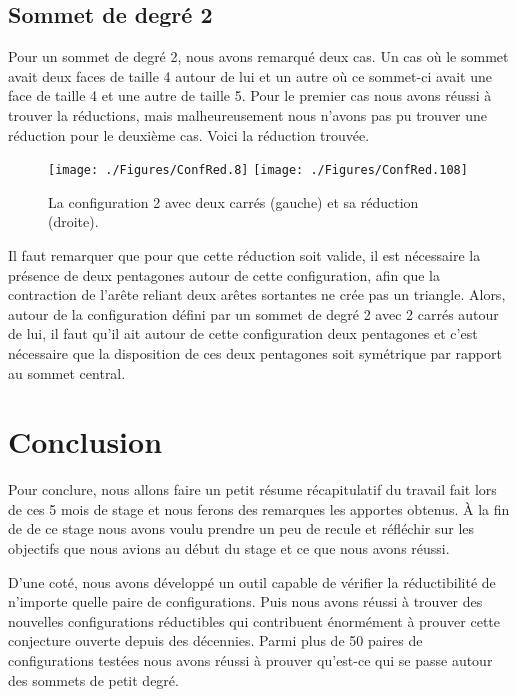 \documentclass[10pt,a4paper]{article}
\begin{document}
\subsection{Sommet de degré 2}
Pour un sommet de degré 2, nous avons remarqué deux cas. Un cas où le sommet avait deux faces de taille 4 autour de lui et un autre où ce sommet-ci avait une face de taille 4 et une autre de taille 5. Pour le premier cas nous avons réussi à trouver la réductions, mais malheureusement nous n'avons pas pu trouver une réduction pour le deuxième cas. Voici la réduction trouvée.

\begin{figure}[ht]
\centerline{
\texttt{[image: ./Figures/ConfRed.8]}
\hfil
\texttt{[image: ./Figures/ConfRed.108]}
}
\caption{La configuration 2 avec deux carrés (gauche) et sa réduction (droite).}
\label{fig:2CC}
\end{figure}

Il faut remarquer que pour que cette réduction soit valide, il est nécessaire la présence de deux pentagones autour de cette configuration, afin que la contraction de l'arête reliant deux arêtes sortantes ne crée pas un triangle. Alors, autour de la configuration défini par un sommet de degré 2 avec 2 carrés autour de lui, il faut qu'il ait autour de cette configuration deux pentagones et c'est nécessaire que la disposition de ces deux pentagones soit symétrique par rapport au sommet central. 

\section{Conclusion}
\label{chap:concl}
Pour conclure, nous allons faire un petit résume récapitulatif du travail fait lors de ces 5 mois de stage et nous ferons des remarques les apportes obtenus. À la fin de de ce stage nous avons voulu prendre un peu de recule et réfléchir sur les objectifs que nous avions au début du stage et ce que nous avons réussi. 

D'une coté, nous avons développé un outil capable de vérifier la réductibilité de n'importe quelle paire de configurations. Puis nous avons réussi à trouver des nouvelles configurations réductibles qui contribuent énormément à prouver cette conjecture ouverte depuis des décennies. Parmi plus de 50 paires de configurations testées nous avons réussi à prouver qu'est-ce qui se passe autour des sommets de petit degré.
\end{document}
